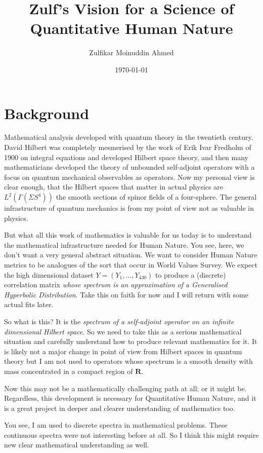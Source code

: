 \documentclass{amsart}
\title{Zulf's Vision for a Science of Quantitative Human Nature}
\author{Zulfikar Moinuddin Ahmed}
\date{\today}
\begin{document}
\maketitle

\section{Background}

Mathematical analysis developed with quantum theory in the twentieth century.  David Hilbert was completely mesmerised by the work of Erik Ivar Fredholm of 1900 on integral equations and developed Hilbert space theory, and then many mathematicians developed the theory of unbounded self-adjoint operators with a focus on quantum mechanical observables as operators.  Now my personal view is clear enough, that the Hilbert spaces that matter in actual physics are $L^2(\Gamma(\Sigma S^4))$ the smooth sections of spinor fields of a four-sphere.  The general infrastructure of quantum mechanics is from my point of view not as valuable in physics.

But what all this work of mathematics is valuable for us today is to understand the mathematical infrastructure needed for Human Nature.  You see, here, we don't want a very general abstract situation.  We want to consider Human Nature metrics to be analogues of the sort that occur in World Values Survey.  We expect the high dimensional dataset $Y=(Y_1,\dots, Y_{430})$ to produce a (discrete) correlation matrix {\em whose spectrum is an approximation of a Generalised Hyperbolic Distribution}.  Take this on faith for now and I will return with some actual fits later.

So what is this?  It is the {\em spectrum of a self-adjoint operator on an infinite dimensional Hilbert space}.  So we need to take this as a serious mathematical situation and carefully understand how to produce relevant mathematics for it.  It is likely not a major change in point of view from Hilbert spaces in quantum theory but I am not used to operators whose spectrum is a smooth density with mass concentrated in a compact region of $\mathbf{R}$. 

Now this may not be a mathematically challenging path at all; or it might be.  Regardless, this development is necessary for Quantitative Human Nature, and it is a great project in deeper and clearer understanding of mathematics too.  

You see, I am used to discrete spectra in mathematical problems.  These continuous spectra were not interesting before at all.  So I think this might require new clear mathematical understanding as well.
\end{document}
